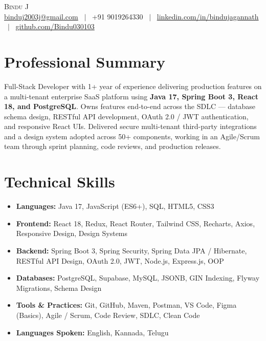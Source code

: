 \documentclass[a4paper,10pt]{article}
\begin{document}
\begin{center}
  {\Huge\scshape\color{navy} Bindu J}\\[5pt]
  \small
  \href{mailto:binduj2003j@gmail.com}{binduj2003j@gmail.com} \ $|$ \
  +91 9019264330 \ $|$ \
  \href{https://www.linkedin.com/in/bindujagannath}{linkedin.com/in/bindujagannath} \ $|$ \
  \href{https://github.com/Bindu030103}{github.com/Bindu030103}
\end{center}

\section{Professional Summary}
Full-Stack Developer with 1+ year of experience delivering production features on a multi-tenant
enterprise SaaS platform using \textbf{Java 17, Spring Boot 3, React 18, and PostgreSQL}. Owns
features end-to-end across the SDLC --- database schema design, RESTful API development,
OAuth 2.0 / JWT authentication, and responsive React UIs. Delivered secure multi-tenant
third-party integrations and a design system adopted across 50+ components, working in an
Agile/Scrum team through sprint planning, code reviews, and production releases.

\section{Technical Skills}
\begin{itemize}
  \item \textbf{Languages:} Java 17, JavaScript (ES6+), SQL, HTML5, CSS3
  \item \textbf{Frontend:} React 18, Redux, React Router, Tailwind CSS, Recharts, Axios,
        Responsive Design, Design Systems
  \item \textbf{Backend:} Spring Boot 3, Spring Security, Spring Data JPA / Hibernate,
        RESTful API Design, OAuth 2.0, JWT, Node.js, Express.js, OOP
  \item \textbf{Databases:} PostgreSQL, Supabase, MySQL, JSONB, GIN Indexing,
        Flyway Migrations, Schema Design
  \item \textbf{Tools \& Practices:} Git, GitHub, Maven, Postman, VS Code, Figma (Basics),
        Agile / Scrum, Code Review, SDLC, Clean Code
  \item \textbf{Languages Spoken:} English, Kannada, Telugu
\end{itemize}
\end{document}
